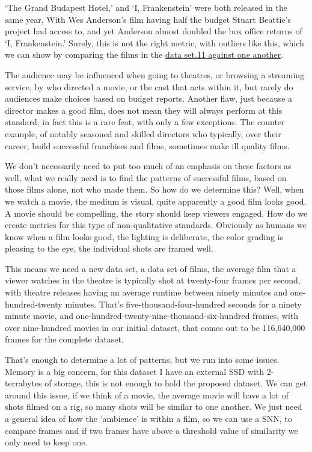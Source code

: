 \documentclass[conference]{IEEEtran}
\begin{document}
‘The Grand Budapest Hotel,’ and ‘I, Frankenstein’  were both released in the same year, With Wes Anderson’s film having half the budget Stuart Beattie’s project had access to, and yet Anderson almost doubled the box office returns of ‘I, Frankenstein.’ Surely, this is not the right metric, with outliers like this, which we can show by comparing the films in the \href{https://www.kaggle.com/datasets/thedevastator/rotten-tomatoes-top-movies-ratings-and-technical}{ data set.11 against one another}.

The audience may be influenced when going to theatres, or browsing a streaming service,  by who directed a movie, or the cast that acts within it, but rarely do audiences make choices based on budget reports. Another flaw, just because a director makes a good film, does not mean they will always perform at this standard, in fact this is a rare feat, with only a few exceptions. The counter example, of notably seasoned and skilled directors who typically, over their career, build successful franchises and films, sometimes make ill quality films.

We don’t necessarily need to put too much of an emphasis on these factors as well, what we really need is to find the patterns of successful films, based on those films alone, not who made them. So how do we determine this? Well, when we watch a movie, the medium is visual, quite apparently a good film looks good. A movie should be compelling, the story should keep viewers engaged. How do we create metrics for this type of non-qualitative standards. Obviously as humans we know when a film looks good, the lighting is deliberate, the color grading is pleasing to the eye, the individual shots are framed well.

This means we need a new data set, a data set of films, the average film that a viewer watches in the theatre is typically shot at twenty-four frames per second, with theatre releases having an average runtime between ninety minutes and one-hundred-twenty minutes. That’s five-thousand-four-hundred seconds for a ninety minute movie, and one-hundred-twenty-nine-thousand-six-hundred frames, with over nine-hundred movies in our initial dataset, that comes out to be 116,640,000 frames for the complete dataset.

That’s enough to determine a lot of patterns, but we run into some issues. Memory is a big concern, for this dataset I have an external SSD with 2-terrabytes of storage, this is not enough to hold the proposed dataset. We can get around this issue, if we think of a movie, the average movie will have a lot of shots filmed on a rig, so many shots will be similar to one another. We just need a general idea of how the ‘ambience’ is within a film, so we can use a SNN, to compare frames and if two frames have above a threshold value of similarity we only need to keep one.
\end{document}
